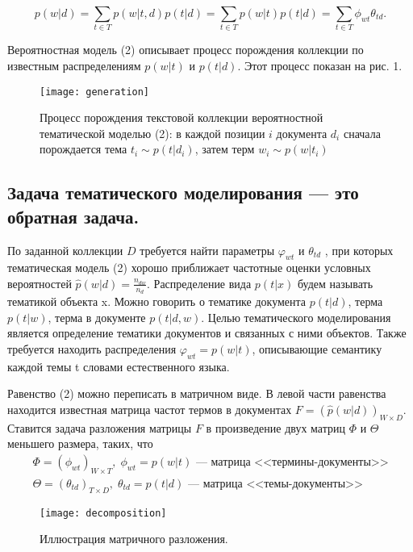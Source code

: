\documentclass[12pt,twoside]{article}
\begin{document}
\begin{equation}\label{eq_0}
p(w|d) = \sum\limits_{t \in T} p(w|t, d) p(t|d) = \sum\limits_{t \in T} p(w|t) p(t|d) = \sum\limits_{t \in T}\phi_{wt}\theta_{td}.
\end{equation}

Вероятностная модель (2) описывает процесс порождения коллекции по известным распределениям $p(w|t)$ и $p(t|d)$. Этот процесс показан на рис. 1.

\begin{figure}[h]
	\texttt{[image: generation]}
	\caption{Процесс порождения текстовой коллекции вероятностной тематической моделью (2): в каждой позиции $i$ документа $d_i$ сначала порождается тема $t_i \sim p(t|d_i)$, затем терм $w_i \sim p(w|t_i)$}
	\label{fg:generation}
\end{figure}

\subsection{Задача тематического моделирования --- это обратная задача.} По заданной коллекции $D$ требуется найти параметры $\varphi_{wt}$ и $\theta_{td}$ , при которых тематическая модель (2)
хорошо приближает частотные оценки условных вероятностей \newline $\hat{p}(w|d)=\frac{n_{dw}}{n_d}$. Распределение вида $p(t|x)$ будем называть тематикой объекта x. Можно говорить о тематике документа $p(t|d)$, терма $p(t|w)$, терма в документе $p(t|d, w)$.
Целью тематического моделирования является определение тематики документов
и связанных с ними объектов. Также требуется находить распределения $\varphi_{wt}= p(w|t)$,
описывающие семантику каждой темы t словами естественного языка.

Равенство (2) можно переписать в матричном виде. В левой части равенства находится известная матрица частот термов в документах $F=(\hat{p}(w|d))_{W \times D}$. Ставится задача разложения матрицы $F$ в произведение двух матриц $\Phi$ и $\Theta$ меньшего размера, таких, что
\begin{gather*}
     \Phi = (\phi_{wt})_{W \times T}, \; \phi_{wt} = p(w|t)      \text{ --- матрица <<термины-документы>>}\\
    \Theta = (\theta_{td})_{T \times D}, \; \theta_{td} = p(t|d)  \text{ --- матрица <<темы-документы>>}
\end{gather*}

\begin{figure}[h]
    \texttt{[image: decomposition]}
    \caption{Иллюстрация матричного разложения.}
    \label{fg:Example}
\end{figure}
\end{document}
